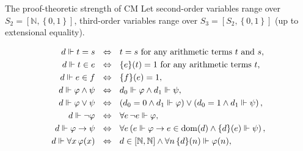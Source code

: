 \documentclass{beamer}
\DeclareMathOperator{\dom}{dom}
\begin{document}
\begin{frame}{The proof-theoretic strength of $\mathrm{CM}$}
  Let second-order variables range over $S_2 = \left[\mathbb{N}, \left\{0, 1\right\}\right]$, third-order variables range over $S_3 = \left[S_2, \left\{0, 1\right\}\right]$ (up to extensional equality).

  \vspace*{-12pt}

  {\scriptsize%
    \begin{align*}
      d \Vdash t = s \ \                                                   & \ratio\Leftrightarrow \ \ t = s \text{ for any arithmetic terms $t$ and $s$},                                                                                  \\
      d \Vdash t \in e \ \                                                 & \ratio\Leftrightarrow \ \ \mleft\{e\mright\}\mleft(t\mright) = 1 \text{ for any arithmetic terms $t$},                                                         \\
      d \Vdash e \in f \ \                                                 & \ratio\Leftrightarrow \ \ \mleft\{f\mright\}\mleft(e\mright) = 1,                                                                                              \\
      d \Vdash \varphi \land \psi \ \                                      & \ratio\Leftrightarrow \ \ d_0 \Vdash \varphi \land d_1 \Vdash \psi,                                                                                            \\
      d \Vdash \varphi \lor \psi \ \                                       & \ratio\Leftrightarrow \ \ \left(d_0 = 0 \land d_1 \Vdash \varphi\right) \lor \left(d_0 = 1 \land d_1 \Vdash \psi\right),                                       \\
      d \Vdash \neg \varphi \ \                                            & \ratio\Leftrightarrow \ \ \forall e \, \neg e \Vdash \varphi,                                                                                                  \\
      d \Vdash \varphi \rightarrow \psi \ \                                & \ratio\Leftrightarrow \ \ \forall e \left(e \Vdash \varphi \rightarrow e \in \dom\mleft(d\mright) \land \mleft\{d\mright\}\mleft(e\mright) \Vdash \psi\right), \\
      d \Vdash \forall x \, \varphi\mleft(x\mright) \ \                    & \ratio\Leftrightarrow \ \ d \in \left[\mathbb{N}, \mathbb{N}\right] \land \forall n \, \mleft\{d\mright\}\mleft(n\mright) \Vdash \varphi\mleft(n\mright),      \\

\end{align*}}
\end{frame}
\end{document}
